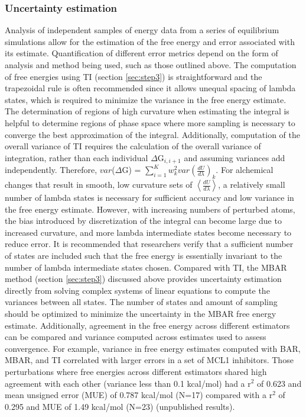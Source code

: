 \documentclass[9pt,bestpractices]{livecoms}
\newcommand{\expect}[1]{\left\langle{#1}\right\rangle}
\begin{document}
\begin{enumerate}
\subsubsection{Uncertainty estimation}
Analysis of independent samples of energy data from a series of equilibrium simulations allow for the estimation of the free energy and error associated with its estimate. 
Quantification of different error metrics depend on the form of analysis and method being used, such as those outlined above.
The computation of free energies using TI (section \ref{sec:step3}) is straightforward and the trapezoidal rule is often recommended since it allows unequal spacing of lambda states, which is required to minimize the variance in the free energy estimate. 
The determination of regions of high curvature when estimating the integral is helpful to determine regions of phase space where more sampling is necessary to converge the best approximation of the integral.
Additionally, computation of the overall variance of TI requires the calculation of the overall variance of integration, rather than each individual $\Delta$G$_{i,i+1}$ and assuming variances add independently. 
Therefore, $var$($\Delta$G) = $\sum_{i=1}^{K}w_{k}^2 var(\frac{dU}{d\lambda})_{k}$.
For alchemical changes that result in smooth, low curvature sets of $\expect{\frac{dU}{d\lambda}}$, a relatively small number of lambda states is necessary for sufficient accuracy and low variance in the free energy estimate. 
However, with increasing numbers of perturbed atoms, the bias introduced by discretization of the integral can become large due to increased curvature, and more lambda intermediate states become necessary to reduce error. 
It is recommended that researchers verify that a sufficient number of states are included such that the free energy is essentially invariant to the number of lambda intermediate states chosen.
Compared with TI, the MBAR method (section \ref{sec:step3}) discussed above provides uncertainty estimation directly from solving complex systems of linear equations to compute the variances between all states. 
The number of states and amount of sampling should be optimized to minimize the uncertainty in the MBAR free energy estimate. 
Additionally, agreement in the free energy across different estimators can be compared and variance computed across estimates used to assess convergence.
For example, variance in free energy estimates computed with BAR, MBAR, and TI correlated with larger errors in a set of MCL1 inhibitors.
Those perturbations where free energies across different estimators shared high agreement with each other (variance less than 0.1 kcal/mol) had a r$^2$ of 0.623 and mean unsigned error (MUE) of 0.787 kcal/mol (N=17) compared with a r$^2$ of 0.295 and MUE of 1.49 kcal/mol (N=23) (unpublished results).

\end{enumerate}
\end{document}
